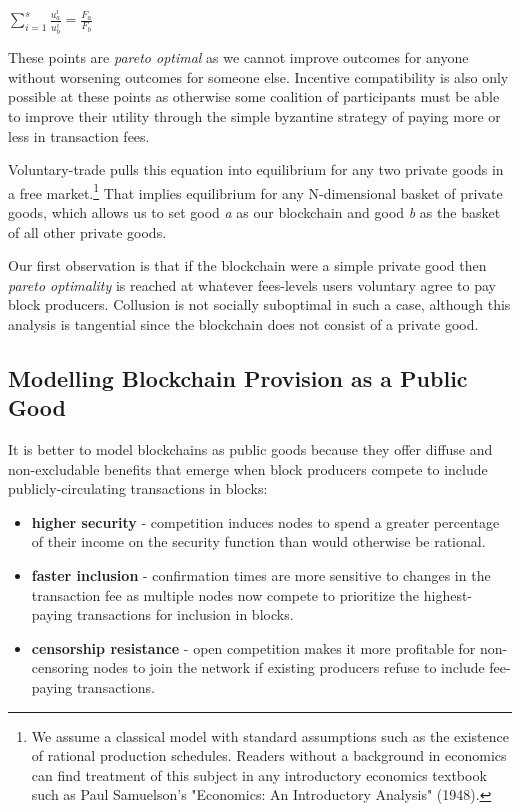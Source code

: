 \documentclass[oneside]{article}   	%
\begin{document}
\LARGE
\begin{adjustwidth}{1.5em}{1.5em} 
\begin{math}
\sum_{i=1}^{s} \frac{u_a^i}{u_b^i} = \frac{F_a}{F_b}
\end{math}
\end{adjustwidth}
\normalsize

These points are \textit{pareto optimal} as we cannot improve outcomes for anyone without worsening outcomes for someone else. Incentive compatibility is also only possible at these points as otherwise some coalition of participants must be able to improve their utility through the simple byzantine strategy of paying more or less in transaction fees.

Voluntary-trade pulls this equation into equilibrium for any two private goods in a free market.\footnote{We assume a classical model with standard assumptions such as the existence of rational production schedules. Readers without a background in economics can find treatment of this subject in any introductory economics textbook such as Paul Samuelson's "Economics: An Introductory Analysis" (1948).} That implies equilibrium for any N-dimensional basket of private goods, which allows us to set good \textit{a} as our blockchain and good \textit{b} as the basket of all other private goods.

Our first observation is that if the blockchain were a simple private good then \textit{pareto optimality} is reached at whatever fees-levels users voluntary agree to pay block producers. Collusion is not socially suboptimal in such a case, although this analysis is tangential since the blockchain does not consist of a private good.

\subsection*{Modelling Blockchain Provision as a Public Good}

It is better to model blockchains as public goods because they offer diffuse and non-excludable benefits that emerge when block producers compete to include publicly-circulating transactions in blocks:

\begin{itemize}
  \item \textbf{higher security} - competition induces nodes to spend a greater percentage of their income on the security function than would otherwise be rational.
  \item \textbf{faster inclusion} - confirmation times are more sensitive to changes in the transaction fee as multiple nodes now compete to prioritize the highest-paying transactions for inclusion in blocks.
  \item \textbf{censorship resistance} - open competition makes it more profitable for non-censoring nodes to join the network if existing producers refuse to include fee-paying transactions.
\end{itemize}
\end{document}
